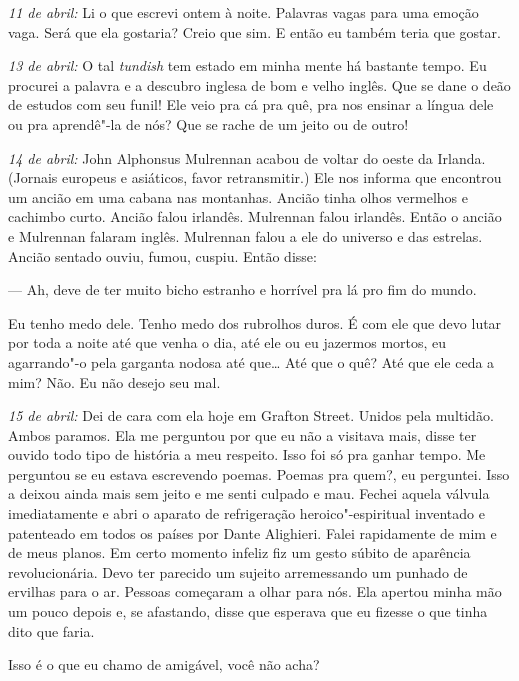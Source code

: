 \medskip\noindent\textit{11 de abril:} Li o que escrevi ontem à noite. Palavras vagas
para uma emoção vaga. Será que ela gostaria? Creio que sim. E então eu
também teria que gostar.

\medskip\noindent\textit{13 de abril:} O tal \textit{tundish} tem estado em minha mente
há bastante tempo. Eu procurei a palavra e a descubro inglesa de bom e
velho inglês. Que se dane o deão de estudos com seu funil! Ele veio
pra cá pra quê, pra nos ensinar a língua dele ou pra aprendê"-la de nós?
Que se rache de um jeito ou de outro!

\medskip\noindent\textit{14 de abril:} John Alphonsus Mulrennan acabou de voltar do oeste
da Irlanda. (Jornais europeus e asiáticos, favor retransmitir.) Ele nos
informa que encontrou um ancião em uma cabana nas montanhas. Ancião
tinha olhos vermelhos e cachimbo curto. Ancião falou irlandês.
Mulrennan falou irlandês. Então o ancião e Mulrennan falaram inglês.
Mulrennan falou a ele do universo e das estrelas. Ancião sentado ouviu,
fumou, cuspiu. Então disse:

 --- Ah, deve de ter muito bicho estranho e horrível pra lá pro fim do mundo.

Eu tenho medo dele. Tenho medo dos rubrolhos duros. É com ele que devo
lutar por toda a noite até que venha o dia, até ele ou eu jazermos
mortos, eu agarrando"-o pela garganta nodosa até que\ldots{} Até que o quê?
Até que ele ceda a mim? Não. Eu não desejo seu mal.

\medskip\noindent\textit{15 de abril:} Dei de cara com ela hoje em Grafton Street. Unidos
pela multidão. Ambos paramos. Ela me perguntou por que eu não a
visitava mais, disse ter ouvido todo tipo de história a meu respeito.
Isso foi só pra ganhar tempo. Me perguntou se eu estava escrevendo
poemas. Poemas pra quem?, eu perguntei. Isso a deixou ainda mais sem
jeito e me senti culpado e mau. Fechei aquela válvula imediatamente e
abri o aparato de refrigeração heroico"-espiritual inventado e
patenteado em todos os países por Dante Alighieri. Falei rapidamente de
mim e de meus planos. Em certo momento infeliz fiz um gesto súbito de
aparência revolucionária. Devo ter parecido um sujeito arremessando um
punhado de ervilhas para o ar. Pessoas começaram a olhar para nós. Ela
apertou minha mão um pouco depois e, se afastando, disse que esperava
que eu fizesse o que tinha dito que faria.

Isso é o que eu chamo de amigável, você não acha?


